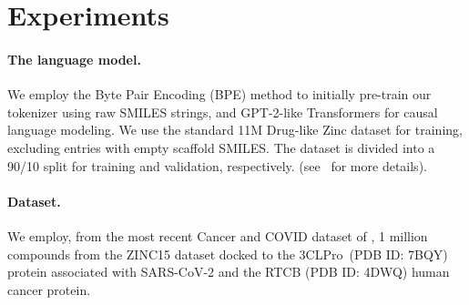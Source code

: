 \vspace{-0.2cm}


\section{{Experiments}}\label{experiments}



\paragraph{The language model.} 
We employ the Byte Pair Encoding (BPE) method \citep{gage1994new_bpe, sennrich2015neural_bpe} to initially pre-train our tokenizer using raw SMILES strings, and GPT-2-like Transformers for causal language modeling. We use the standard 11M Drug-like Zinc dataset for training, excluding entries with empty scaffold SMILES. The dataset is divided into a 90/10 split for training and validation, respectively. (see~ for more details).
\paragraph{Dataset.}
We employ, from the most recent Cancer and COVID dataset of \citet{liu2023drugimprover}, 1 million compounds from the ZINC15 dataset docked to the 3CLPro~(PDB ID: 7BQY) protein associated with SARS-CoV-2 and the RTCB (PDB ID: 4DWQ) human cancer protein. 



